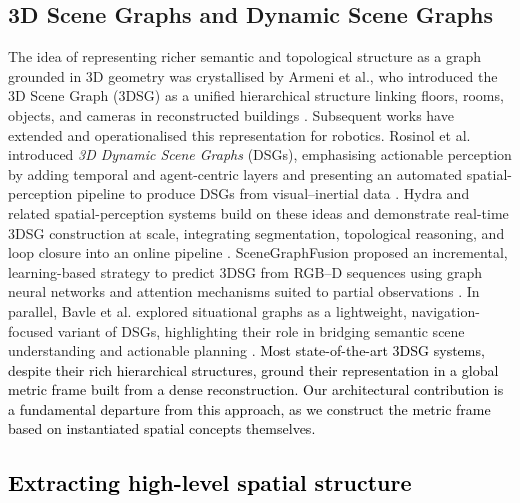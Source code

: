 \documentclass[10pt,a4paper]{article}
\begin{document}
\subsection{3D Scene Graphs and Dynamic Scene Graphs}
The idea of representing richer semantic and topological structure as a graph grounded in 3D geometry was crystallised by Armeni et al., who introduced the 3D Scene Graph (3DSG) as a unified hierarchical structure linking floors, rooms, objects, and cameras in reconstructed buildings \cite{armeni20193dscenegraphstructure}. Subsequent works have extended and operationalised this representation for robotics. Rosinol et al. introduced \emph{3D Dynamic Scene Graphs} (DSGs), emphasising actionable perception by adding temporal and agent-centric layers and presenting an automated spatial-perception pipeline to produce DSGs from visual–inertial data \cite{rosinol20203ddynamicscenegraphs}. Hydra and related spatial-perception systems build on these ideas and demonstrate real-time 3DSG construction at scale, integrating segmentation, topological reasoning, and loop closure into an online pipeline \cite{hughes2022hydra, hughes2024foundations}. SceneGraphFusion proposed an incremental, learning-based strategy to predict 3DSG from RGB–D sequences using graph neural networks and attention mechanisms suited to partial observations \cite{wu2021scenegraphfusionincremental3dscene}. In parallel, Bavle et al. explored situational graphs as a lightweight, navigation-focused variant of DSGs, highlighting their role in bridging semantic scene understanding and actionable planning \cite{bavle2022situational}. \textcolor{black}{Most state-of-the-art 3DSG systems, despite their rich hierarchical structures, ground their representation in a global metric frame built from a dense reconstruction. Our architectural contribution is a fundamental departure from this approach, as we construct the metric frame based on instantiated spatial concepts themselves.}


\subsection{\textcolor{black}{Extracting high-level spatial structure}}
\end{document}
